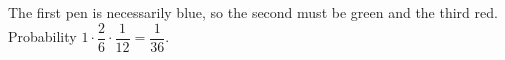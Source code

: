 The first pen is necessarily blue, so the second must be green and the third red. Probability $1\cdot\dfrac{2}{6}\cdot\dfrac{1}{12}=\boxed{\dfrac{1}{36}}$.
